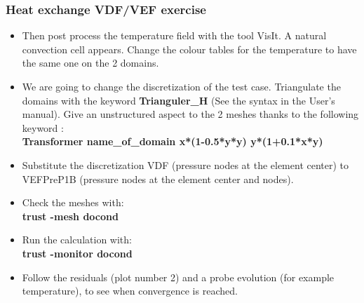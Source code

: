 \documentclass[10pt]{beamer}
\begin{document}
\begin{frame}
\frametitle{Heat exchange VDF/VEF exercise}
\begin{block}{}

\begin{itemize}
\item Then post process the temperature field with the tool VisIt. A natural convection cell appears. Change the colour tables for the temperature to have the same one on the 2 domains.

\item We are going to change the discretization of the test case. Triangulate the domains with the keyword \textbf{Trianguler\_H} (See the syntax in the User's manual). Give an unstructured aspect to the 2 meshes thanks to the following keyword : \\
\textbf{Transformer name\_of\_domain \; x*(1-0.5*y*y) \; y*(1+0.1*x*y)}

\item Substitute the discretization VDF (pressure nodes at the element center) to VEFPreP1B (pressure nodes at the element center and nodes).

\item Check the meshes with: \\
\textbf{trust -mesh docond}

\item Run the calculation with:\\
\textbf{trust -monitor docond}

\item Follow the residuals (plot number 2) and a probe evolution (for example temperature), to see when convergence is reached.
\end{itemize}

\end{block}
\end{frame}
\end{document}
